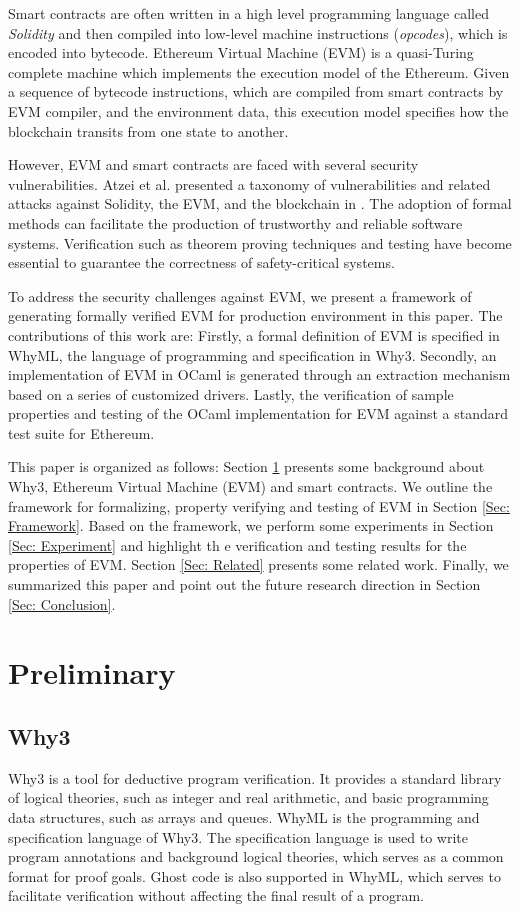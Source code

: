 \documentclass[runningheads]{llncs}
\begin{document}
Smart contracts are often written in a high level programming language called \textit{Solidity} \cite{solidity} and then compiled into low-level machine instructions (\textit{opcodes}), which is encoded into bytecode. Ethereum Virtual Machine (EVM) is a quasi-Turing complete machine which implements the execution model of the Ethereum. Given a sequence of bytecode instructions, which are compiled from smart contracts by EVM compiler, and the environment data, this execution model specifies how the blockchain transits from one state to another. 

However, EVM and smart contracts are faced with several security vulnerabilities. Atzei et al. presented a taxonomy of vulnerabilities and related attacks against Solidity, the EVM, and the blockchain in \cite{atzei2016survey}. The adoption of formal methods can facilitate the production of trustworthy and reliable software systems. Verification such as theorem proving techniques and testing have become essential to guarantee the correctness of safety-critical systems. 

To address the security challenges against EVM, we present a framework of generating formally verified EVM for production environment in this paper. The contributions of this work are: Firstly, a formal definition of EVM is specified in WhyML, the language of programming and specification in Why3. Secondly, an implementation of EVM in OCaml is generated through an extraction mechanism based on a series of customized drivers. Lastly, the verification of sample properties and testing of the OCaml implementation for EVM against a standard test suite for Ethereum.

This paper is organized as follows: Section \ref{Sec: Pre} presents some background about Why3, Ethereum Virtual Machine (EVM) and smart contracts. We outline the framework for formalizing, property verifying and testing of EVM in Section \ref{Sec: Framework}. Based on the framework, we perform some experiments in Section \ref{Sec: Experiment} and highlight th e verification and testing results for the properties of EVM. Section \ref{Sec: Related} presents some related work. Finally, we summarized this paper and point out the future research direction in Section \ref{Sec: Conclusion}.


\section{Preliminary}\label{Sec: Pre}
\subsection{Why3}
Why3\cite{filliatre2013why3} is a tool for deductive program verification. It provides a standard library of logical theories, such as integer and real arithmetic, and basic programming data structures, such as arrays and queues. WhyML is the programming and specification language of Why3. The specification language is used to write program annotations and background logical theories, which serves as a common format for proof goals. Ghost code is also supported in WhyML, which serves to facilitate verification without affecting the final result of a program.
\end{document}
